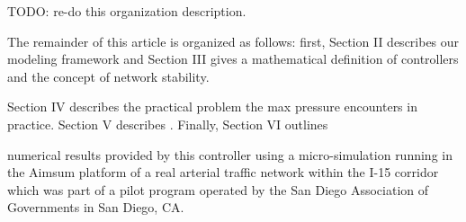 {
\color{red} TODO: re-do this organization description. 

The remainder of this article is organized as follows: first, Section II describes our modeling framework and Section III gives a mathematical definition of controllers and the concept of network stability. 

Section IV describes the practical problem the max pressure encounters in practice. Section V describes . Finally, Section VI outlines 

 numerical results provided by this controller using a micro-simulation running in the Aimsum platform of a real arterial traffic network within the I-15 corridor which was part of a pilot program operated by the San Diego Association of Governments in San Diego, CA. 
}



%
%


